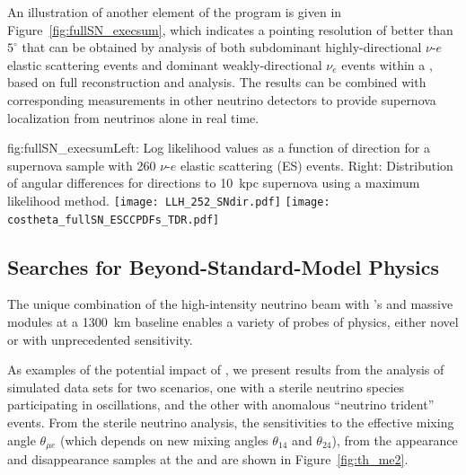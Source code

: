 An illustration 
of another element of the   program 
is given in Figure~\ref{fig:fullSN_execsum}, 
which indicates a pointing resolution of better than $5^\circ$ that 
can be obtained by analysis of both subdominant highly-directional $\nu$-$e$ elastic scattering 
events and dominant weakly-directional $\nu_e$  events within a , based 
on full reconstruction and analysis. The  results can be 
combined with corresponding measurements in other neutrino detectors to 
provide supernova localization from neutrinos alone in real time.
%
\begin{dunefigure}{fig:fullSN_execsum}{Left: Log
    likelihood values as a function of direction for a
    supernova sample with 260 $\nu$-$e$ elastic scattering (ES) events.  Right: Distribution of angular differences for
    directions to \SI{10}{kpc} supernova using a maximum likelihood
    method.}
  \texttt{[image: LLH\_252\_SNdir.pdf]}
  \texttt{[image: costheta\_fullSN\_ESCCPDFs\_TDR.pdf]}
\end{dunefigure}

\subsection{Searches for Beyond-Standard-Model Physics}


The unique combination of the high-intensity  neutrino beam with
's   and massive   modules at a 
\SI{1300}{\km} baseline enables a variety of probes of  
physics, either novel or with unprecedented sensitivity.

As examples of the potential impact of , we present results from the 
analysis of simulated data sets for two  scenarios, one with 
a sterile neutrino species participating in oscillations, 
and the other with anomalous ``neutrino trident'' events.
%
From the sterile neutrino analysis,  
the  sensitivities to the effective mixing angle $\theta_{\mu e}$
(which depends on new mixing angles $\theta_{14}$ and $\theta_{24}$), from the appearance and disappearance samples at the  and  are shown in Figure~\ref{fig:th_me2}. 
%

